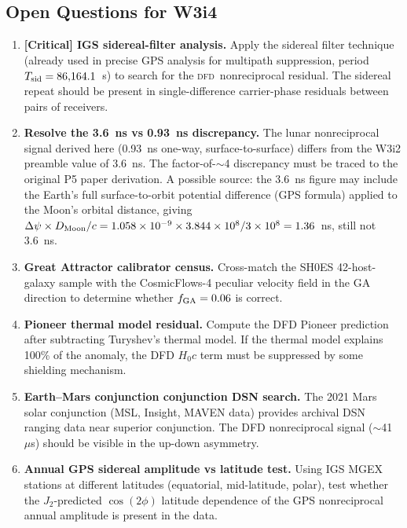 \documentclass[aps,prd,twocolumn,superscriptaddress,nofootinbib,longbibliography]{revtex4-2}
\newcommand{\DFD}{\textsc{dfd}}
\begin{document}
\subsection{Open Questions for W3i4}

\begin{enumerate}

\item \textbf{[Critical] IGS sidereal-filter analysis.}
Apply the sidereal filter technique (already used in precise GPS analysis
for multipath suppression, period $T_{\rm sid} = 86{,}164.1$~s) to search for
the \DFD\ nonreciprocal residual.  The sidereal repeat should be present
in single-difference carrier-phase residuals between pairs of receivers.

\item \textbf{Resolve the 3.6~ns vs 0.93~ns discrepancy.}
The lunar nonreciprocal signal derived here (0.93~ns one-way, surface-to-surface)
differs from the W3i2 preamble value of 3.6~ns.  The factor-of-$\sim$4
discrepancy must be traced to the original P5 paper derivation.  A possible
source: the 3.6~ns figure may include the Earth's full surface-to-orbit
potential difference (GPS formula) applied to the Moon's orbital distance,
giving $\Delta\psi\times D_{\rm Moon}/c = 1.058\times10^{-9}
\times3.844\times10^8/3\times10^8 = 1.36$~ns, still not 3.6~ns.

\item \textbf{Great Attractor calibrator census.}
Cross-match the SH0ES 42-host-galaxy sample with the CosmicFlows-4
peculiar velocity field in the GA direction to determine whether
$f_{\rm GA} = 0.06$ is correct.

\item \textbf{Pioneer thermal model residual.}
Compute the DFD Pioneer prediction after subtracting Turyshev's thermal
model.  If the thermal model explains 100\% of the anomaly, the DFD
$H_0 c$ term must be suppressed by some shielding mechanism.

\item \textbf{Earth--Mars conjunction conjunction DSN search.}
The 2021 Mars solar conjunction (MSL, Insight, MAVEN data) provides
archival DSN ranging data near superior conjunction.  The DFD nonreciprocal
signal ($\sim$41~$\mu$s) should be visible in the up-down asymmetry.

\item \textbf{Annual GPS sidereal amplitude vs latitude test.}
Using IGS MGEX stations at different latitudes (equatorial, mid-latitude, polar),
test whether the $J_2$-predicted $\cos(2\phi)$ latitude dependence of the
GPS nonreciprocal annual amplitude is present in the data.

\end{enumerate}
\end{document}
